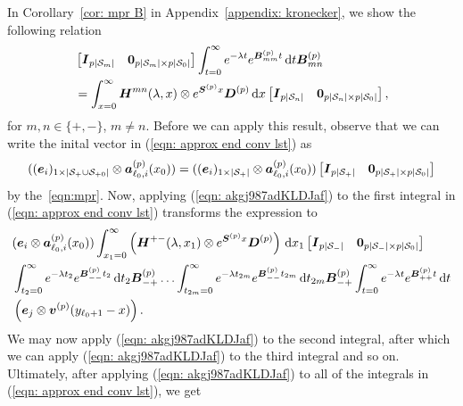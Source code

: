 In Corollary~\ref{cor: mpr B} in Appendix~\ref{appendix: kronecker}, we show the following relation
\begin{align}
	&\vligne{\bs I_{p|\calS_m|} & \bs 0_{p|\calS_m|\times p|\calS_0|} }\int_{t=0}^\infty e^{-\lambda t} e^{\bs{B}^{(p)}_{mm}t} \wrt t \bs{B}^{(p)}_{m{n}} \nonumber %
	\\&= \int_{x=0}^\infty \bs H^{mn}(\lambda,x)  \otimes  e^{\bs S^{(p)} x}\bs D^{(p)}\wrt x \vligne{\bs I_{p|\calS_n|} & \bs 0_{p|\calS_n|\times p|\calS_0|}}, \label{eqn: akgj987adKLDJaf}
\end{align}
for \(m,n\in\{+,-\}\), \(m\neq n\). Before we can apply this result, observe that we can write the inital vector in (\ref{eqn: approx end conv lst}) as 
\[((\boldsymbol e_i)_{1\times |\mathcal{S}_+\cup\mathcal{S}_{+0}|}\otimes \boldsymbol  a_{\ell_0,i}^{(p)}(x_0)) = ((\boldsymbol e_i)_{1\times |\mathcal{S}_+|}\otimes \boldsymbol  a_{\ell_0,i}^{(p)}(x_0))\begin{bmatrix} \boldsymbol I_{p|\mathcal{S}_+|} & \boldsymbol 0_{p|\mathcal{S}_+|\times p|\mathcal{S}_0|} \end{bmatrix}\]
by the~\ref{eqn:mpr}. 
Now, applying (\ref{eqn: akgj987adKLDJaf}) to the first integral in (\ref{eqn: approx end conv lst}) transforms the expression to 
\begin{align}
	&(\boldsymbol e_i\otimes \boldsymbol  a_{\ell_0,i}^{(p)}(x_0)) \int_{x_1=0}^\infty \left(\boldsymbol H^{+{-}}(\lambda,x_1) \otimes e^{\boldsymbol S^{(p)} x}\boldsymbol D^{(p)}\right) \, \mathrm{d} x_1 \begin{bmatrix} \boldsymbol I_{p|\mathcal{S}_-|} & \boldsymbol 0_{p|\mathcal{S}_-|\times p|\mathcal{S}_0|} \end{bmatrix} \nonumber
	\\&\int_{t_2=0}^\infty e^{-\lambda t_2} e^{\boldsymbol{B}^{(p)}_{--}t_2} \, \mathrm{d} t_2\boldsymbol{B}^{(p)}_{-{+}} 
	\hdots 
	\int_{t_{2m}=0}^\infty e^{-\lambda t_{2m}}e^{\boldsymbol{B}^{(p)}_{--}t_{2m}} \, \mathrm{d} t_{2m}\boldsymbol{B}^{(p)}_{-{+}} 
	\int_{t=0}^\infty e^{-\lambda t}e^{\boldsymbol{B}^{(p)}_{++}t} \, \mathrm{d} t \nonumber
	\\&\left(\boldsymbol e_j \otimes {\boldsymbol v}^{(p)}(y_{\ell_0+1}-x)\right). \label{eqn: approx end conv lst2}
\end{align}
We may now apply (\ref{eqn: akgj987adKLDJaf}) to the second integral, after which we can apply (\ref{eqn: akgj987adKLDJaf}) to the third integral and so on. Ultimately, after applying (\ref{eqn: akgj987adKLDJaf}) to all of the integrals in (\ref{eqn: approx end conv lst}), we get 
